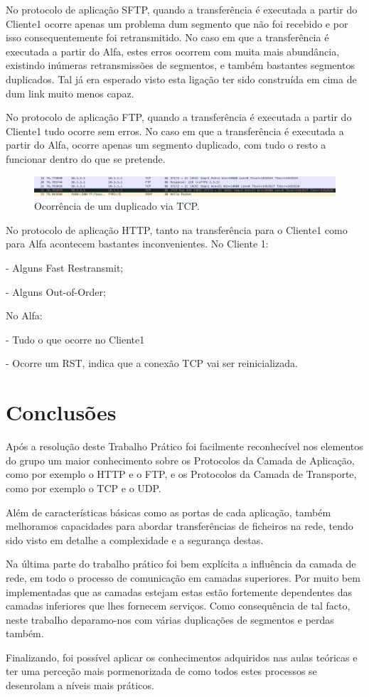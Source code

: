 \documentclass{llncs}
\begin{document}
No protocolo de aplicação SFTP, quando a transferência é executada a partir do Cliente1 ocorre apenas um problema dum segmento que não foi recebido e por isso consequentemente foi retransmitido. No caso em que a transferência é executada a partir do Alfa, estes erros ocorrem com muita mais abundância, existindo inúmeras retransmissões de segmentos, e também bastantes segmentos duplicados. Tal já era esperado visto esta ligação ter sido construída em cima de dum link muito menos capaz.

No protocolo de aplicação FTP, quando a transferência é executada a partir do Cliente1 tudo ocorre sem erros. No caso em que a transferência é executada a partir do Alfa, ocorre apenas um segmento duplicado, com tudo o resto a funcionar dentro do que se pretende.
\begin{figure}[H]
\begin{center}
\includegraphics[scale=0.40]{4_ftp.png}
\end{center}
\caption{\label{fig:ssh}Ocorrência de um duplicado via TCP.}
\end{figure}

No protocolo de aplicação HTTP, tanto na transferência para o Cliente1 como para Alfa acontecem bastantes inconvenientes. No Cliente 1:

	- Alguns Fast Restransmit;

	- Alguns Out-of-Order;

No Alfa:

	- Tudo o que ocorre no Cliente1

	- Ocorre um RST, indica que a conexão TCP vai ser reinicializada.



\section{Conclusões}

Após a resolução deste Trabalho Prático foi facilmente reconhecível nos elementos do grupo um maior conhecimento sobre os  Protocolos da Camada de Aplicação, como por exemplo o HTTP e o FTP, e os Protocolos da Camada de Transporte, como por exemplo o TCP e o UDP.

Além de características básicas como as portas de cada aplicação, também melhoramos capacidades para abordar transferências de ficheiros na rede, tendo sido visto em detalhe a complexidade e a segurança destas.

Na última parte do trabalho prático foi bem explícita a influência da camada de rede, em todo o processo de comunicação em camadas superiores. Por muito bem implementadas que as camadas estejam estas estão fortemente dependentes das camadas inferiores que lhes fornecem serviços. Como consequência de tal facto, neste trabalho deparamo-nos com várias duplicações de segmentos e perdas também.

Finalizando, foi possível aplicar os conhecimentos adquiridos nas aulas teóricas e ter uma perceção mais pormenorizada de como todos estes processos se desenrolam a níveis mais práticos.
\end{document}
